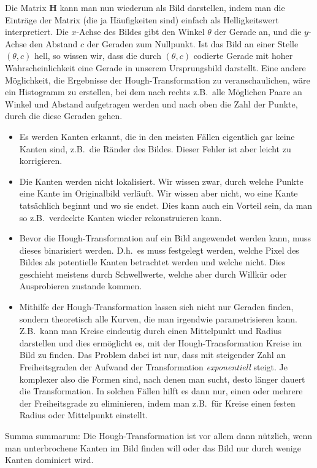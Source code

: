 Die Matrix $ \mathbf{H} $ kann man nun wiederum als Bild darstellen, indem man die Einträge der
Matrix (die ja Häufigkeiten sind) einfach als Helligkeitswert interpretiert. Die $ x $-Achse des
Bildes gibt den Winkel $ \theta $ der Gerade an, und die $ y $-Achse den Abstand $ c $ der Geraden 
zum Nullpunkt. Ist das Bild an einer Stelle $ (\theta, c) $ hell, so wissen wir, dass die durch
$ (\theta, c) $ codierte Gerade mit hoher Wahrscheinlichkeit eine Gerade in unserem Ursprungsbild
darstellt. Eine andere Möglichkeit, die Ergebnisse der Hough-Transformation zu veranschaulichen,
wäre ein Histogramm zu erstellen, bei dem nach rechts z.B.\ alle Möglichen Paare an Winkel und
Abstand aufgetragen werden und nach oben die Zahl der Punkte, durch die diese Geraden gehen.

\begin{remark} \leavevmode
\begin{itemize}
\item Es werden Kanten erkannt, die in den meisten Fällen eigentlich gar keine Kanten sind, z.B.\ 
  die Ränder des Bildes. Dieser Fehler ist aber leicht zu korrigieren.
\item Die Kanten werden nicht lokalisiert. Wir wissen zwar, durch welche Punkte eine Kante im
  Originalbild verläuft. Wir wissen aber nicht, wo eine Kante tatsächlich beginnt und wo sie endet.
  Dies kann auch ein Vorteil sein, da man so z.B.\ verdeckte Kanten wieder rekonstruieren kann.
\item Bevor die Hough-Transformation auf ein Bild angewendet werden kann, muss dieses binarisiert
  werden. D.h.\ es muss festgelegt werden, welche Pixel des Bildes als potentielle Kanten
  betrachtet werden und welche nicht. Dies geschieht meistens durch Schwellwerte, welche aber durch
  Willkür oder Ausprobieren zustande kommen.
\item Mithilfe der Hough-Transformation lassen sich nicht nur Geraden finden, sondern theoretisch
  alle Kurven, die man irgendwie parametrisieren kann. Z.B.\ kann man Kreise eindeutig durch
  einen Mittelpunkt und Radius darstellen und dies ermöglicht es, mit der Hough-Transformation 
  Kreise im Bild zu finden. Das Problem dabei ist nur, dass mit steigender Zahl an Freiheitsgraden 
  der Aufwand der Transformation \emph{exponentiell} steigt. Je komplexer also die Formen sind,
  nach denen man sucht, desto länger dauert die Transformation. In solchen Fällen hilft es dann nur,
  einen oder mehrere der Freiheitsgrade zu eliminieren, indem man z.B.\ für Kreise einen festen
  Radius oder Mittelpunkt einstellt.
\end{itemize}
Summa summarum: Die Hough-Transformation ist vor allem dann nützlich, wenn man unterbrochene
Kanten im Bild finden will oder das Bild nur durch wenige Kanten dominiert wird.
\end{remark}